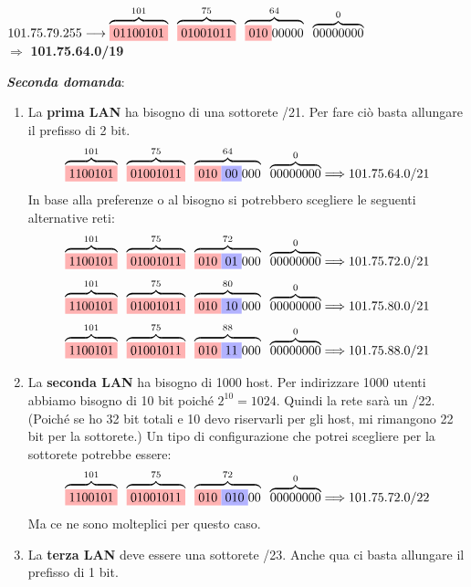 \documentclass[12pt]{article}
\begin{document}
\begin{center}
$101.75.79.255 \longrightarrow \overbrace{\colorbox{red!30!white}{01100101}}^{101} \; \; \overbrace{\colorbox{red!30!white}{01001011}}^{75} \; \; \overbrace{\colorbox{red!30!white}{010}00000}^{64} \; \; \overbrace{00000000}^{0}$\\
$\Longrightarrow$ \textbf{101.75.64.0/19}
\end{center}
\textbf{\textit{Seconda domanda}}:
\begin{enumerate}
\item La \textbf{prima LAN} ha bisogno di una sottorete /21. Per fare ciò basta allungare il prefisso di 2 bit. 
\[\overbrace{\colorbox{red!30!white}{1100101}}^{101} \; \; \overbrace{\colorbox{red!30!white}{01001011}}^{75} \; \; \overbrace{\colorbox{red!30!white}{010}\colorbox{blue!30!white}{00}000}^{64} \; \; \overbrace{00000000}^{0} \Longrightarrow 101.75.64.0/21\]
In base alla preferenze o al bisogno si potrebbero scegliere le seguenti alternative reti:
\[\overbrace{\colorbox{red!30!white}{1100101}}^{101} \; \; \overbrace{\colorbox{red!30!white}{01001011}}^{75} \; \; \overbrace{\colorbox{red!30!white}{010}\colorbox{blue!30!white}{01}000}^{72} \; \; \overbrace{00000000}^{0} \Longrightarrow 101.75.72.0/21\]
\[\overbrace{\colorbox{red!30!white}{1100101}}^{101} \; \; \overbrace{\colorbox{red!30!white}{01001011}}^{75} \; \; \overbrace{\colorbox{red!30!white}{010}\colorbox{blue!30!white}{10}000}^{80} \; \; \overbrace{00000000}^{0} \Longrightarrow 101.75.80.0/21\]
\[\overbrace{\colorbox{red!30!white}{1100101}}^{101} \; \; \overbrace{\colorbox{red!30!white}{01001011}}^{75} \; \; \overbrace{\colorbox{red!30!white}{010}\colorbox{blue!30!white}{11}000}^{88} \; \; \overbrace{00000000}^{0} \Longrightarrow 101.75.88.0/21\]
\item La \textbf{seconda LAN }ha bisogno di 1000 host. Per indirizzare 1000 utenti abbiamo bisogno di 10 bit poiché $2^{10} = 1024$. Quindi la rete sarà un /22. (Poiché se ho 32 bit totali e 10 devo riservarli per gli host, mi rimangono 22 bit per la sottorete.) Un tipo di configurazione che potrei scegliere per la sottorete potrebbe essere:
\[\overbrace{\colorbox{red!30!white}{1100101}}^{101} \; \; \overbrace{\colorbox{red!30!white}{01001011}}^{75} \; \; \overbrace{\colorbox{red!30!white}{010}\colorbox{blue!30!white}{010}00}^{72} \; \; \overbrace{00000000}^{0} \Longrightarrow 101.75.72.0/22\]
Ma ce ne sono molteplici per questo caso.
\item La \textbf{terza LAN} deve essere una sottorete /23. Anche qua ci basta allungare il prefisso di 1 bit.

\end{enumerate}
\end{document}
